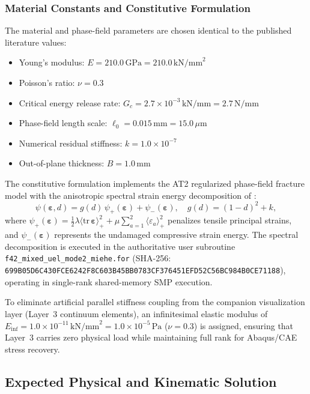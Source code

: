 \subsubsection{Material Constants and Constitutive Formulation}
The material and phase-field parameters are chosen identical to the published literature values:
\begin{itemize}
  \item Young's modulus: $E = 210.0\,\mathrm{GPa} = 210.0\,\mathrm{kN/mm}^2$
  \item Poisson's ratio: $\nu = 0.3$
  \item Critical energy release rate: $G_c = 2.7\times 10^{-3}\,\mathrm{kN/mm} = 2.7\,\mathrm{N/mm}$
  \item Phase-field length scale: $\ell_0 = 0.015\,\mathrm{mm} = 15.0\,\mu\mathrm{m}$
  \item Numerical residual stiffness: $k = 1.0\times 10^{-7}$
  \item Out-of-plane thickness: $B = 1.0\,\mathrm{mm}$
\end{itemize}
The constitutive formulation implements the AT2 regularized phase-field fracture model with the anisotropic spectral strain energy decomposition of \citet{miehe2010a,miehe2010b}:
\begin{equation}
  \psi(\boldsymbol{\varepsilon}, d) = g(d)\,\psi_+(\boldsymbol{\varepsilon}) + \psi_-(\boldsymbol{\varepsilon}), \quad g(d) = (1-d)^2 + k,
  \label{eq:miehe_split}
\end{equation}
where $\psi_+(\boldsymbol{\varepsilon}) = \frac{1}{2}\lambda \langle \mathrm{tr}\,\boldsymbol{\varepsilon} \rangle_+^2 + \mu \sum_{a=1}^2 \langle \varepsilon_a \rangle_+^2$ penalizes tensile principal strains, and $\psi_-(\boldsymbol{\varepsilon})$ represents the undamaged compressive strain energy. The spectral decomposition is executed in the authoritative user subroutine \nolinkurl{f42_mixed_uel_mode2_miehe.for} (SHA-256: \texttt{699B05D6C430FCE6242F8C603B45BB0783CF376451EFD52C56BC984B0CE71188}), operating in single-rank shared-memory SMP execution. 

To eliminate artificial parallel stiffness coupling from the companion visualization layer (Layer~3 continuum elements), an infinitesimal elastic modulus of $E_{\mathrm{inf}} = 1.0\times 10^{-11}\,\mathrm{kN/mm}^2 = 1.0\times 10^{-5}\,\mathrm{Pa}$ ($\nu = 0.3$) is assigned, ensuring that Layer~3 carries zero physical load while maintaining full rank for Abaqus/CAE stress recovery.

\subsection{Expected Physical and Kinematic Solution}
\label{subsec:mode2_expected_solution}

